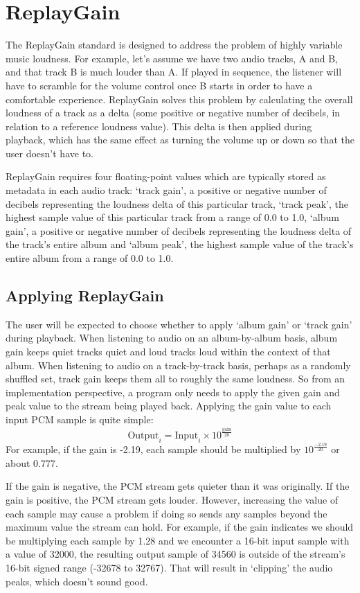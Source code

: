 \chapter{ReplayGain}
The ReplayGain standard is designed to address the problem of
highly variable music loudness.
For example, let's assume we have two audio tracks, A and B, and that
track B is much louder than A.
If played in sequence, the listener will have to scramble for the volume
control once B starts in order to have a comfortable experience.
ReplayGain solves this problem by calculating the overall loudness of a
track as a delta (some positive or negative number of decibels, in
relation to a reference loudness value).
This delta is then applied during playback, which has the same effect
as turning the volume up or down so that the user doesn't have to.

ReplayGain requires four floating-point values which are typically
stored as metadata in each audio track:
`track gain', a positive or negative number of decibels representing
the loudness delta of this particular track,
`track peak', the highest sample value of this particular track
from a range of 0.0 to 1.0,
`album gain', a positive or negative number of decibels representing
the loudness delta of the track's entire album
and `album peak', the highest sample value of the track's entire album
from a range of 0.0 to 1.0.

\section{Applying ReplayGain}
The user will be expected to choose whether to apply `album gain'
or `track gain' during playback.
When listening to audio on an album-by-album basis, album gain
keeps quiet tracks quiet and loud tracks loud within the context of
that album.
When listening to audio on a track-by-track basis, perhaps as
a randomly shuffled set, track gain keeps them all to roughly the same
loudness.
So from an implementation perspective, a program only needs to apply
the given gain and peak value to the stream being played back.
Applying the gain value to each input PCM sample is quite simple:
\begin{equation}
\text{Output}_i = \text{Input}_i \times 10 ^ \frac{\text{gain}}{20}
\end{equation}
For example, if the gain is -2.19, each sample should be multiplied by
$10 ^ \frac{-2.19}{20}$ or about 0.777.

If the gain is negative, the PCM stream gets quieter than it was
originally.
If the gain is positive, the PCM stream gets louder.
However, increasing the value of each sample may cause a problem
if doing so sends any samples beyond the maximum value the stream
can hold.
For example, if the gain indicates we should be multiplying each sample
by 1.28 and we encounter a 16-bit input sample with a value of 32000,
the resulting output sample of 34560 is outside of the stream's
16-bit signed range (-32678 to 32767).
That will result in `clipping' the audio peaks, which doesn't sound good.


